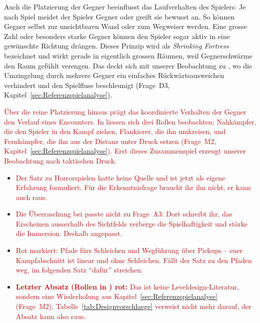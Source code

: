 \documentclass[../Main.tex]{subfiles}
\begin{document}
Auch die Platzierung der Gegner beeinflusst das Laufverhalten des Spielers: Je nach Spiel meidet der Spieler Gegner oder greift sie bewusst an. So können Gegner selbst zur unsichtbaren Wand oder zum Wegweiser werden.\autocite[199]{totten2014architectural} Eine grosse Zahl oder besonders starke Gegner können den Spieler sogar aktiv in eine gewünschte Richtung drängen. Dieses Prinzip wird als \textit{Shrinking Fortress} bezeichnet und wirkt gerade in eigentlich grossen Räumen, weil Gegnerschwärme den Raum gefühlt verengen.\autocite[199--200]{totten2014architectural} Das deckt sich mit unserer Beobachtung zu , wo die Umzingelung durch mehrere Gegner ein einfaches Rückwärtsausweichen verhindert und den Spielfluss beschleunigt (Frage~D3, Kapitel~\ref{sec:Referenzspielanalyse}).

\textcolor{red}{Über die reine Platzierung hinaus prägt das koordinierte Verhalten der Gegner den Verlauf eines Encounters. In  liessen sich drei Rollen beobachten: Nahkämpfer, die den Spieler in den Kampf ziehen, Flankierer, die ihn umkreisen, und Fernkämpfer, die ihn aus der Distanz unter Druck setzen (Frage~M2, Kapitel~\ref{sec:Referenzspielanalyse}). Erst dieses Zusammenspiel erzeugt unserer Beobachtung nach taktischen Druck.}

\begin{itemize}[leftmargin=1.5cm]
    \item \textcolor{red}{Der Satz zu Horrorspielen hatte keine Quelle und ist jetzt als eigene Erfahrung formuliert. Für die Erkenntnisfrage braucht ihr ihn nicht, er kann auch raus.}
    \item \textcolor{red}{Die Überraschung bei  passte nicht zu Frage~A3: Dort schreibt ihr, das Erscheinen ausserhalb des Sichtfelds verberge die Spielhaftigkeit und stärke die Immersion. Deshalb angepasst.}
    \item \textcolor{red}{Rot markiert: Pfade fürs Schleichen und Wegführung über Pickups -- euer Kampfabschnitt ist linear und ohne Schleichen. Fällt der Satz zu den Pfaden weg, im folgenden Satz \enquote{dafür} streichen.}
    \item \textcolor{red}{\textbf{Letzter Absatz (Rollen in ) rot:} Das ist keine Leveldesign-Literatur, sondern eine Wiederholung aus Kapitel~\ref{sec:Referenzspielanalyse} (Frage~M2). Tabelle~\ref{tab:Designvorschlaege} verweist nicht mehr darauf, der Absatz kann also raus.}
\end{itemize}
\end{document}
